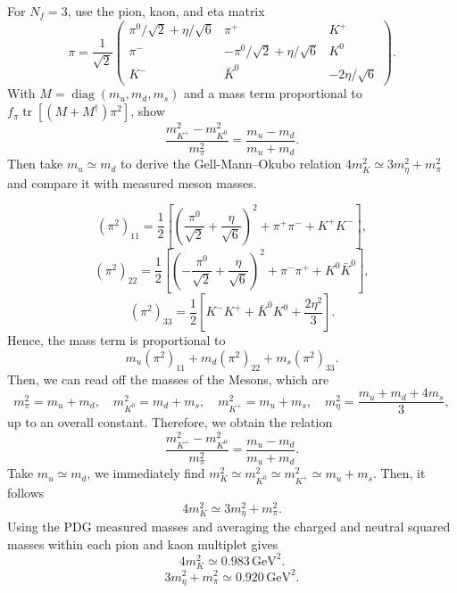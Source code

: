 For $N_f=3$, use the pion, kaon, and eta matrix
\begin{equation}
    \pi=\frac1{\sqrt2}
    \begin{pmatrix}
    \pi^0/\sqrt2+\eta/\sqrt6&\pi^+&K^+\\
    \pi^-&-\pi^0/\sqrt2+\eta/\sqrt6&K^0\\
    K^-&\bar K^0&-2\eta/\sqrt6
    \end{pmatrix}.
\end{equation}
With $M=\operatorname{diag}(m_u,m_d,m_s)$ and a mass term
proportional to $f_\pi\operatorname{tr}[(M+M^\dagger)\pi^2]$,
show
\begin{equation}
    \frac{m_{K^+}^2-m_{K^0}^2}{m_\pi^2}
    =\frac{m_u-m_d}{m_u+m_d}.
\end{equation}
Then take $m_u\simeq m_d$ to derive the Gell-Mann--Okubo relation
$4m_K^2\simeq3m_\eta^2+m_\pi^2$ and compare it with measured
meson masses.
\begin{solution}
\[
(\pi^2)_{11}=\frac12\left[\left(\frac{\pi^0}{\sqrt2}+\frac{\eta}{\sqrt6}\right)^2+\pi^+\pi^-+K^+K^-\right],
\]\[
(\pi^2)_{22}=\frac12\left[\left(-\frac{\pi^0}{\sqrt2}+\frac{\eta}{\sqrt6}\right)^2+\pi^-\pi^++K^0\bar K^0\right],
\]\[
(\pi^2)_{33}=\frac12\left[K^-K^++\bar K^0K^0+\frac{2\eta^2}{3}\right].
\]
Hence, the mass term is proportional to
\begin{equation}
     m_u (\pi^2)_{11} +  m_d (\pi^2)_{22} + m_s (\pi^2)_{33}.
\end{equation}
Then, we can read off the masses of the Mesons, which are
\begin{equation}
    m_{\pi}^2 =  m_u + m_d, \quad m_{K^0}^2 = m_d + m_s, \quad m_{K^+}^2 = m_u + m_s,\quad m_\eta^2 = \frac{m_u + m_d + 4m_s}{3},
\end{equation}
up to an overall constant. Therefore, we obtain the relation
\begin{equation}
    \frac{m_{K^+}^2-m_{K^0}^2}{m_\pi^2}
    =\frac{m_u-m_d}{m_u+m_d}.
\end{equation}
Take $m_u \simeq m_d$, we immediately find $m_{K}^2 \simeq m_{K^0}^2 \simeq m_{K^+}^2\simeq m_u + m_s$. Then, it follows
\begin{equation}
    4m_K^2\simeq3m_\eta^2+m_\pi^2.
\end{equation}
Using the PDG measured masses and averaging the charged and neutral squared masses within each pion and kaon multiplet gives
\[
4m_K^2 \simeq 0.983\,\mathrm{GeV}^2.
\]\[
3m_\eta^2+m_\pi^2 \simeq 0.920\,\mathrm{GeV}^2.
\]
\end{solution}

